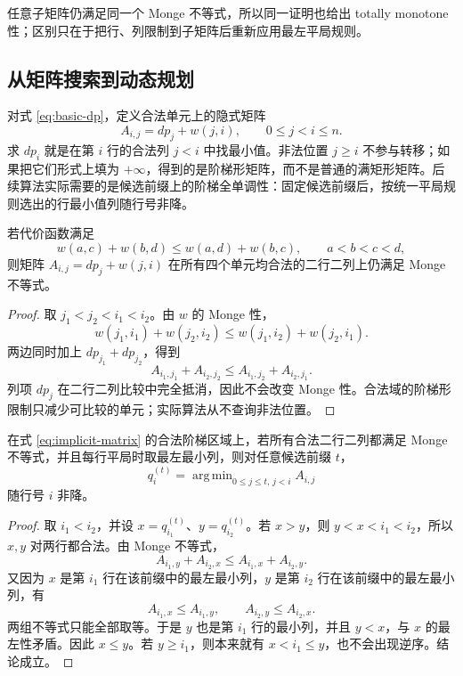 \documentclass[lang=cn,a4paper,newtx,code=minted,bibtex]{elegantpaper}
\DeclareMathOperator*{\argmin}{arg\,min}
\begin{document}
任意子矩阵仍满足同一个 Monge 不等式，所以同一证明也给出 totally monotone 性；区别只在于把行、列限制到子矩阵后重新应用最左平局规则。

\subsection{从矩阵搜索到动态规划}

对式 \eqref{eq:basic-dp}，定义合法单元上的隐式矩阵
\begin{equation}
  A_{i,j}=dp_j+w(j,i),\qquad 0\le j<i\le n .
  \label{eq:implicit-matrix}
\end{equation}
求 $dp_i$ 就是在第 $i$ 行的合法列 $j<i$ 中找最小值。非法位置 $j\ge i$ 不参与转移；如果把它们形式上填为 $+\infty$，得到的是阶梯形矩阵，而不是普通的满矩形矩阵。后续算法实际需要的是候选前缀上的阶梯全单调性：固定候选前缀后，按统一平局规则选出的行最小值列随行号非降。

\begin{lemma}
若代价函数满足
\[
  w(a,c)+w(b,d)\le w(a,d)+w(b,c),\qquad a<b<c<d,
\]
则矩阵 $A_{i,j}=dp_j+w(j,i)$ 在所有四个单元均合法的二行二列上仍满足 Monge 不等式。
\end{lemma}

\begin{proof}
取 $j_1<j_2<i_1<i_2$。由 $w$ 的 Monge 性，
\[
  w(j_1,i_1)+w(j_2,i_2)\le w(j_1,i_2)+w(j_2,i_1).
\]
两边同时加上 $dp_{j_1}+dp_{j_2}$，得到
\[
  A_{i_1,j_1}+A_{i_2,j_2}\le A_{i_1,j_2}+A_{i_2,j_1}.
\]
列项 $dp_j$ 在二行二列比较中完全抵消，因此不会改变 Monge 性。合法域的阶梯形限制只减少可比较的单元；实际算法从不查询非法位置。
\end{proof}

\begin{lemma}[候选前缀上的阶梯全单调性]
\label{lem:staircase-prefix}
在式 \eqref{eq:implicit-matrix} 的合法阶梯区域上，若所有合法二行二列都满足 Monge 不等式，并且每行平局时取最左最小列，则对任意候选前缀 $t$，
\[
  q_i^{(t)}=\argmin_{0\le j\le t,\,j<i} A_{i,j}
\]
随行号 $i$ 非降。
\end{lemma}

\begin{proof}
取 $i_1<i_2$，并设 $x=q_{i_1}^{(t)}$、$y=q_{i_2}^{(t)}$。若 $x>y$，则 $y<x<i_1<i_2$，所以 $x,y$ 对两行都合法。由 Monge 不等式，
\[
  A_{i_1,y}+A_{i_2,x}\le A_{i_1,x}+A_{i_2,y}.
\]
又因为 $x$ 是第 $i_1$ 行在该前缀中的最左最小列，$y$ 是第 $i_2$ 行在该前缀中的最左最小列，有
\[
  A_{i_1,x}\le A_{i_1,y},\qquad A_{i_2,y}\le A_{i_2,x}.
\]
两组不等式只能全部取等。于是 $y$ 也是第 $i_1$ 行的最小列，并且 $y<x$，与 $x$ 的最左性矛盾。因此 $x\le y$。若 $y\ge i_1$，则本来就有 $x<i_1\le y$，也不会出现逆序。结论成立。
\end{proof}
\end{document}
